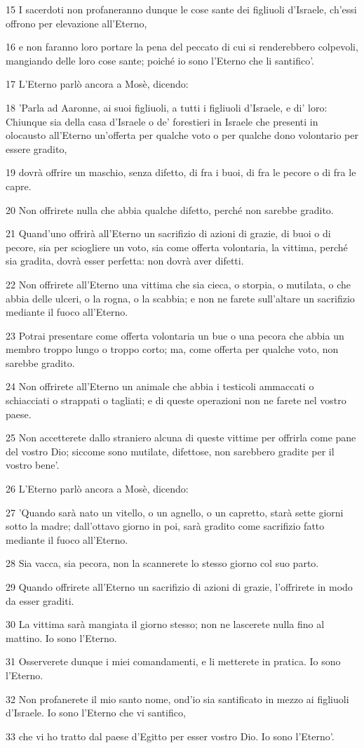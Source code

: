 \par 15 I sacerdoti non profaneranno dunque le cose sante dei figliuoli d'Israele, ch'essi offrono per elevazione all'Eterno,
\par 16 e non faranno loro portare la pena del peccato di cui si renderebbero colpevoli, mangiando delle loro cose sante; poiché io sono l'Eterno che li santifico'.
\par 17 L'Eterno parlò ancora a Mosè, dicendo:
\par 18 'Parla ad Aaronne, ai suoi figliuoli, a tutti i figliuoli d'Israele, e di' loro: Chiunque sia della casa d'Israele o de' forestieri in Israele che presenti in olocausto all'Eterno un'offerta per qualche voto o per qualche dono volontario per essere gradito,
\par 19 dovrà offrire un maschio, senza difetto, di fra i buoi, di fra le pecore o di fra le capre.
\par 20 Non offrirete nulla che abbia qualche difetto, perché non sarebbe gradito.
\par 21 Quand'uno offrirà all'Eterno un sacrifizio di azioni di grazie, di buoi o di pecore, sia per sciogliere un voto, sia come offerta volontaria, la vittima, perché sia gradita, dovrà esser perfetta: non dovrà aver difetti.
\par 22 Non offrirete all'Eterno una vittima che sia cieca, o storpia, o mutilata, o che abbia delle ulceri, o la rogna, o la scabbia; e non ne farete sull'altare un sacrifizio mediante il fuoco all'Eterno.
\par 23 Potrai presentare come offerta volontaria un bue o una pecora che abbia un membro troppo lungo o troppo corto; ma, come offerta per qualche voto, non sarebbe gradito.
\par 24 Non offrirete all'Eterno un animale che abbia i testicoli ammaccati o schiacciati o strappati o tagliati; e di queste operazioni non ne farete nel vostro paese.
\par 25 Non accetterete dallo straniero alcuna di queste vittime per offrirla come pane del vostro Dio; siccome sono mutilate, difettose, non sarebbero gradite per il vostro bene'.
\par 26 L'Eterno parlò ancora a Mosè, dicendo:
\par 27 'Quando sarà nato un vitello, o un agnello, o un capretto, starà sette giorni sotto la madre; dall'ottavo giorno in poi, sarà gradito come sacrifizio fatto mediante il fuoco all'Eterno.
\par 28 Sia vacca, sia pecora, non la scannerete lo stesso giorno col suo parto.
\par 29 Quando offrirete all'Eterno un sacrifizio di azioni di grazie, l'offrirete in modo da esser graditi.
\par 30 La vittima sarà mangiata il giorno stesso; non ne lascerete nulla fino al mattino. Io sono l'Eterno.
\par 31 Osserverete dunque i miei comandamenti, e li metterete in pratica. Io sono l'Eterno.
\par 32 Non profanerete il mio santo nome, ond'io sia santificato in mezzo ai figliuoli d'Israele. Io sono l'Eterno che vi santifico,
\par 33 che vi ho tratto dal paese d'Egitto per esser vostro Dio. Io sono l'Eterno'.

